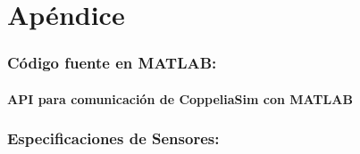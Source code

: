 \documentclass{article}
\begin{document}
\begin{sloppypar}
\section*{Apéndice}

\subsubsection*{Código fuente en MATLAB:}

\paragraph*{API para comunicación de CoppeliaSim con MATLAB}
\label{sec:API para comunicación de CoppeliaSim con MATLAB}
\hfill

\subsubsection*{Especificaciones de Sensores:}






\end{sloppypar}
\end{document}
